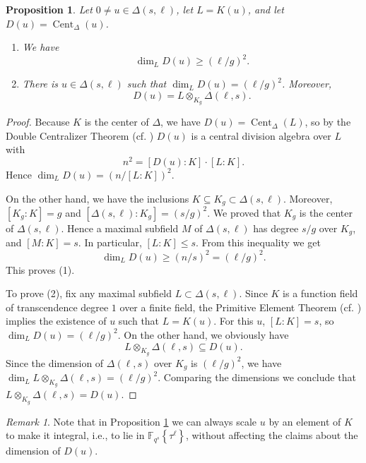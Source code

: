 \documentclass[12pt]{amsart}
\newtheorem{prop}[thm]{Proposition}
\theoremstyle{definition}
\theoremstyle{remark}
\newtheorem{rem}[thm]{Remark}
\numberwithin{equation}{section}
\numberwithin{thm}{section}
\DeclareMathOperator{\End}{End}
\DeclareMathOperator{\Cent}{Cent}
\newcommand{\F}{\mathbb{F}}
\newcommand{\twistt}[2]{#1\!\left\{#2\right\}}
\begin{document}
\begin{prop}\label{prop3.2} Let $0\neq u\in \Delta(s, \ell)$, let $L=K(u)$, and let $D(u)=\Cent_\Delta(u)$. 
	\begin{enumerate}
		\item We have 
		$$
		\dim_L D(u) \geq (\ell/g)^2. 
		$$
		\item There is $u\in \Delta(s, \ell)$ such that $\dim_L D(u)=(\ell /g)^2$. Moreover, $$D(u)=L\otimes_{K_g} \Delta(\ell,s).$$ 
	\end{enumerate}
\end{prop}
\begin{proof} Because $K$ is the center of $\Delta$, we have $D(u)=\Cent_\Delta(L)$, so by the Double Centralizer Theorem (cf. 
	\cite[Thm. 1.7.22]{PapikianGTM}) $D(u)$ is a central division algebra over $L$ with 
	$$
	n^2=[D(u):K]\cdot [L:K]. 
	$$
	Hence $\dim_L D(u)=(n/[L:K])^2$. 
	
	On the other hand, we have the inclusions $K\subseteq K_g \subset \Delta(s, \ell)$. Moreover, $[K_g:K]=g$ and $[\Delta(s, \ell):K_g]=(s/g)^2$. 
	We proved that $K_g$ is the center of $\Delta(s, \ell)$. Hence a maximal subfield $M$ of $\Delta(s, \ell)$ has degree $s/g$ over $K_g$, and  
	$[M:K]=s$. In particular, $[L:K]\leq s$. From this inequality we get 
	$$\dim_L D(u)\geq (n/s)^2=(\ell/g)^2.$$
	This proves (1). 
	
	To prove (2), fix any maximal subfield $L\subset \Delta(s, \ell)$. Since $K$ is a function field of transcendence degree $1$ over a finite field, the Primitive Element Theorem (cf. \cite[Thm. 1.5.19]{PapikianGTM}) implies the existence of $u$ such that $L=K(u)$. For this $u$, $[L:K]=s$, so $\dim_L D(u)=(\ell/g)^2$. 
	On the other hand, we obviously have 
	$$
	L\otimes_{K_g}\Delta(\ell, s)\subseteq D(u). 
	$$
	Since the dimension of $\Delta(\ell, s)$ over $K_g$ is $(\ell/g)^2$, we have $\dim_L L\otimes_{K_g}\Delta(\ell, s) = (\ell/g)^2$. Comparing the 
	dimensions  we conclude that $L\otimes_{K_g}\Delta(\ell, s)=D(u)$. 
\end{proof}

\begin{rem}
	Note that in Proposition \ref{prop3.2} we can always scale $u$ by an element of $K$ to make it integral, i.e., to lie in $\twistt{\F_{q^s}}{\tau^\ell}$, 
	without affecting the claims about the dimension of $D(u)$. %
\end{rem}
\end{document}
